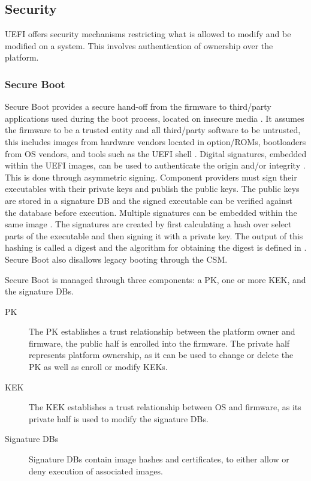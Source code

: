 
\subsection{Security}

\ac{UEFI} offers security mechanisms restricting what is allowed to modify and be modified on a system.
This involves authentication of ownership over the platform.

\subsubsection{Secure Boot}
\label{sec:uefi-pi:uefi:secure-boot}

Secure Boot provides a secure hand-off from the firmware to third\-/party applications used during the boot process, located on insecure media \cite{tianocore-understanding-uefi-secure-boot-chain} \cite[Sections 32.2 and 32.5.1]{uefi-spec}.
It assumes the firmware to be a trusted entity and all third\-/party software to be untrusted, this includes images from hardware vendors located in  option\-/\acsp{ROM}, bootloaders from \ac{OS} vendors, and tools such as the \ac{UEFI} shell \cite{tianocore-understanding-uefi-secure-boot-chain}.
Digital signatures, embedded within the \ac{UEFI} images, can be used to authenticate the origin and/or integrity \cite[Section 32.2]{uefi-spec}.
This is done through asymmetric signing.
Component providers must sign their executables with their private keys and publish the public keys.
The public keys are stored in a signature \ac{DB} and the signed executable can be verified against the database before execution.
Multiple signatures can be embedded within the same image \cite[Section 32.2.2]{uefi-spec}.
The signatures are created by first calculating a hash over select parts of the executable and then signing it with a private key.
The output of this hashing is called a digest and the algorithm for obtaining the digest is defined in \cite{microsoft-pe-signature-format}.
Secure Boot also disallows legacy booting through the \ac{CSM}.

Secure Boot is managed through three components: a \ac{PK}, one or more \ac{KEK}, and the signature \acp{DB}.

\begin{description}
    \item[\acl{PK}]
        The \ac{PK} establishes a trust relationship between the platform owner and firmware, the public half is enrolled into the firmware.
        The private half represents platform ownership, as it can be used to change or delete the \ac{PK} as well as enroll or modify \acp{KEK}.
    \item[\acl{KEK}]
        The \ac{KEK} establishes a trust relationship between \ac{OS} and firmware, as its private half is used to modify the signature \acfp{DB}.
    \item[Signature \aclp{DB}]
        Signature \acp{DB} contain image hashes and certificates, to either allow or deny execution of associated images.
\end{description}

